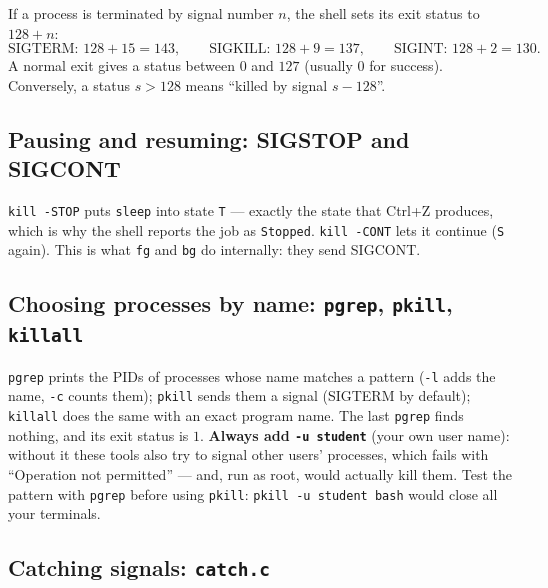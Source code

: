 \documentclass[11pt,a4paper]{article}
\newcommand{\cmd}[1]{\texttt{#1}}
\begin{document}
\begin{keyidea}
If a process is terminated by signal number $n$, the shell sets its exit status to $128 + n$:
\[
\text{SIGTERM: } 128 + 15 = 143, \qquad \text{SIGKILL: } 128 + 9 = 137, \qquad \text{SIGINT: } 128 + 2 = 130 .
\]
A normal exit gives a status between $0$ and $127$ (usually $0$ for success). Conversely, a status $s > 128$ means ``killed by signal $s - 128$''.
\end{keyidea}

\subsection{Pausing and resuming: SIGSTOP and SIGCONT}



\cmd{kill -STOP} puts \cmd{sleep} into state \texttt{T} --- exactly the state that Ctrl+Z produces, which is why the shell reports the job as \texttt{Stopped}. \cmd{kill -CONT} lets it continue (\texttt{S} again). This is what \cmd{fg} and \cmd{bg} do internally: they send SIGCONT.

\subsection{Choosing processes by name: \texttt{pgrep}, \texttt{pkill}, \texttt{killall}}
\label{sec:pkill}



\cmd{pgrep} prints the PIDs of processes whose name matches a pattern (\cmd{-l} adds the name, \cmd{-c} counts them); \cmd{pkill} sends them a signal (SIGTERM by default); \cmd{killall} does the same with an exact program name. The last \cmd{pgrep} finds nothing, and its exit status is $1$. \textbf{Always add \cmd{-u student}} (your own user name): without it these tools also try to signal other users' processes, which fails with ``Operation not permitted'' --- and, run as root, would actually kill them. Test the pattern with \cmd{pgrep} before using \cmd{pkill}: \cmd{pkill -u student bash} would close all your terminals.

\subsection{Catching signals: \texttt{catch.c}}
\end{document}
